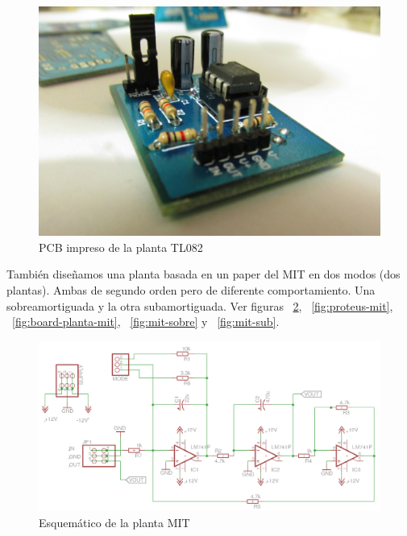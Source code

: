 \begin{figure}[h!]
  \centering
  \includegraphics[scale=0.05]{images/activities/plantas_analogicas/TL082.jpg}
  \caption{PCB impreso de la planta TL082}
  \label{fig:TL082}
\end{figure}

También diseñamos una planta basada en un paper del MIT en dos modos (dos plantas). Ambas de segundo orden pero de diferente comportamiento. Una sobreamortiguada y la otra subamortiguada. Ver figuras ~\ref{fig:schematic-planta-mit}, ~\ref{fig:proteus-mit}, ~\ref{fig:board-planta-mit}, ~\ref{fig:mit-sobre} y ~\ref{fig:mit-sub}.

\begin{figure}[h!]
  \centering
  \includegraphics[scale=0.25]{images/activities/plantas_analogicas/schematic-planta-mit.png}
  \caption{Esquemático de la planta MIT}
  \label{fig:schematic-planta-mit}
\end{figure}

